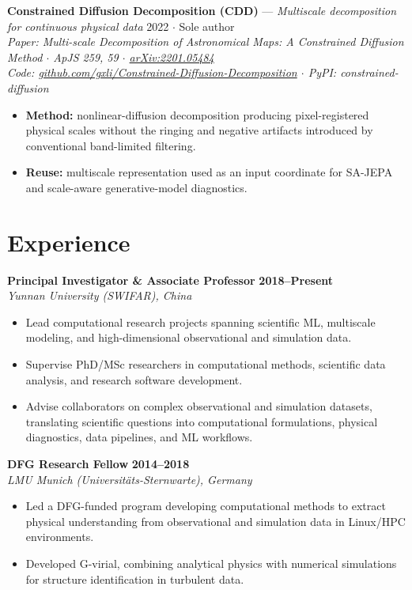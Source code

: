 \documentclass[10pt]{article}
\newcommand{\projtitle}[1]{{\fontsize{9.5}{11.4}\selectfont #1}}
\begin{document}
\projtitle{\textbf{Constrained Diffusion Decomposition (CDD)} --- \textit{Multiscale decomposition for
continuous physical data}}
\hfill{\footnotesize\color{contactgray!70} 2022 $\cdot$ Sole author}\\[2pt]
{\fontsize{6.5}{7.8}\selectfont\color{contactgray!50}\itshape Paper: Multi-scale Decomposition of Astronomical Maps:
A Constrained Diffusion Method $\cdot$ ApJS 259, 59 $\cdot$ \href{https://arxiv.org/abs/2201.05484}{arXiv:2201.05484}\\
Code: \href{https://github.com/gxli/Constrained-Diffusion-Decomposition}{github.com/gxli/Constrained-Diffusion-Decomposition} $\cdot$ PyPI: constrained-diffusion}
\begin{itemize}
  \item \textbf{Method:} nonlinear-diffusion decomposition producing pixel-registered physical
        scales without the ringing and negative artifacts introduced by conventional band-limited
        filtering.
  \item \textbf{Reuse:} multiscale representation used as an input coordinate for SA-JEPA and
        scale-aware generative-model diagnostics.
\end{itemize}

\section*{Experience}
\textbf{Principal Investigator \& Associate Professor} \hfill \textbf{2018--Present}\\
\textit{Yunnan University (SWIFAR), China}\\
\begin{itemize}
  \item Lead computational research projects spanning scientific ML, multiscale modeling, and
        high-dimensional observational and simulation data.
  \item Supervise PhD/MSc researchers in computational methods, scientific data analysis, and
        research software development.
  \item Advise collaborators on complex observational and simulation datasets, translating
        scientific questions into computational formulations, physical diagnostics, data pipelines,
        and ML workflows.
\end{itemize}
\vspace{3pt}

\textbf{DFG Research Fellow} \hfill \textbf{2014--2018}\\
\textit{LMU Munich (Universit\"ats-Sternwarte), Germany}\\
\begin{itemize}
  \item Led a DFG-funded program developing computational methods to extract physical understanding
        from observational and simulation data in Linux/HPC environments.
  \item Developed G-virial, combining analytical physics with numerical simulations for structure
        identification in turbulent data.
\end{itemize}
\vspace{3pt}
\end{document}
